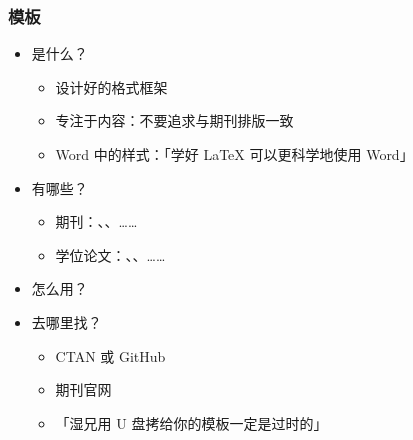 \begin{frame}[fragile]
\frametitle{模板}
\begin{itemize}
  \item<+-> 是什么？

    \begin{itemize}
      \item 设计好的格式框架
      \item 专注于内容：\alert{不要追求与期刊排版一致}
      \item Word 中的样式：「学好 \LaTeX{} 可以更科学地使用 Word」
    \end{itemize}

  \item<+-> 有哪些？

    \begin{itemize}
      \item 期刊：、、……
      \item 学位论文：、、\alert{}……
    \end{itemize}

  \item<+-> 怎么用？


  \item<+-> 去哪里找？

    \begin{itemize}
      \item CTAN  或 GitHub \href{https://github.com}{\faGithub}
      \item 期刊官网
      \item 「湿兄用 U 盘拷给你的模板一定是过时的」
    \end{itemize}
\end{itemize}
\end{frame}

